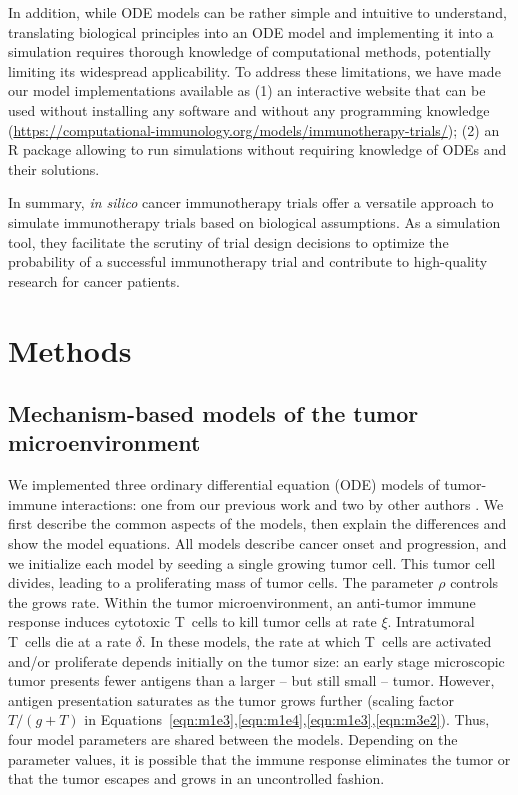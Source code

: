 \documentclass[a4paper,10pt]{article}
\begin{document}
In addition, while ODE models can be rather simple and intuitive to understand,
translating biological principles into an ODE model and implementing it into a
simulation requires thorough knowledge of computational methods, potentially
limiting its widespread applicability. To address these limitations, we have 
made our model implementations available as (1) an interactive website that can
be used without installing any software and without any programming knowledge
(\url{https://computational-immunology.org/models/immunotherapy-trials/});
(2) an R package allowing to run simulations without requiring knowledge of ODEs
and their solutions.

In summary, \emph{in silico} cancer immunotherapy trials offer a versatile approach to
simulate immunotherapy trials based on biological assumptions. As
a simulation tool, they facilitate the scrutiny of trial design decisions
to optimize the probability of a successful immunotherapy trial and contribute
to high-quality research for cancer patients. 

\clearpage


\section*{Methods}

\subsection*{Mechanism-based models of the tumor microenvironment}

We implemented three ordinary differential equation (ODE) models of tumor-immune interactions:
one from our previous work \cite{Creemers2021} and two by other authors \cite{Tsur2020,Bekker2022}. 
We first describe the common aspects of the models, then explain the differences and show the 
model equations. All models describe cancer onset and progression, and we initialize each model by
seeding a single growing tumor cell. This tumor cell divides, leading to a
proliferating mass of tumor cells. The parameter $\rho$ controls the grows rate.
Within the tumor microenvironment, an anti-tumor immune response induces cytotoxic T~cells to kill tumor cells at rate $\xi$.
Intratumoral T~cells die at a rate $\delta$. 
In these models, the rate at which T~cells are activated and/or proliferate depends initially on the tumor size: 
an early stage microscopic tumor presents fewer antigens than a larger -- but still small -- tumor.
However, antigen presentation saturates as the tumor grows further (scaling factor $T/(g+T)$ in
Equations~\ref{eqn:m1e3},\ref{eqn:m1e4},\ref{eqn:m1e3},\ref{eqn:m3e2}).  
Thus, four model
parameters are shared between the models. Depending on the 
parameter values, it is possible that the immune response eliminates the tumor or that the tumor escapes and 
grows in an uncontrolled fashion.
\end{document}
